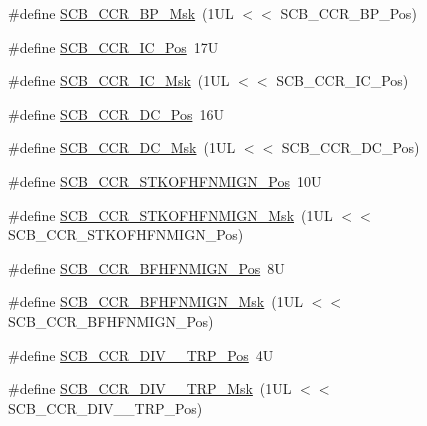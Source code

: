 \begin{DoxyCompactItemize}
\item 
\#define \mbox{\hyperlink{group___c_m_s_i_s___s_c_b_ga7fac248cabee94546aa9530d27217772}{S\+C\+B\+\_\+\+C\+C\+R\+\_\+\+B\+P\+\_\+\+Msk}}~(1\+U\+L $<$$<$ S\+C\+B\+\_\+\+C\+C\+R\+\_\+\+B\+P\+\_\+\+Pos)
\item 
\#define \mbox{\hyperlink{group___c_m_s_i_s___s_c_b_ga33f0f2a0818b2570f3e00b7e79501448}{S\+C\+B\+\_\+\+C\+C\+R\+\_\+\+I\+C\+\_\+\+Pos}}~17U
\item 
\#define \mbox{\hyperlink{group___c_m_s_i_s___s_c_b_gaf2ff8f5957edac919e28b536aa6c0a59}{S\+C\+B\+\_\+\+C\+C\+R\+\_\+\+I\+C\+\_\+\+Msk}}~(1\+U\+L $<$$<$ S\+C\+B\+\_\+\+C\+C\+R\+\_\+\+I\+C\+\_\+\+Pos)
\item 
\#define \mbox{\hyperlink{group___c_m_s_i_s___s_c_b_gaa1896a99252649cfb96139b56ba87d9b}{S\+C\+B\+\_\+\+C\+C\+R\+\_\+\+D\+C\+\_\+\+Pos}}~16U
\item 
\#define \mbox{\hyperlink{group___c_m_s_i_s___s_c_b_ga57b3909dff40a9c28ec50991e4202678}{S\+C\+B\+\_\+\+C\+C\+R\+\_\+\+D\+C\+\_\+\+Msk}}~(1\+U\+L $<$$<$ S\+C\+B\+\_\+\+C\+C\+R\+\_\+\+D\+C\+\_\+\+Pos)
\item 
\#define \mbox{\hyperlink{group___c_m_s_i_s___s_c_b_ga98372e0d55ce8573350ce36c500e0555}{S\+C\+B\+\_\+\+C\+C\+R\+\_\+\+S\+T\+K\+O\+F\+H\+F\+N\+M\+I\+G\+N\+\_\+\+Pos}}~10U
\item 
\#define \mbox{\hyperlink{group___c_m_s_i_s___s_c_b_gaf7004d71376738038e912def01c31fe8}{S\+C\+B\+\_\+\+C\+C\+R\+\_\+\+S\+T\+K\+O\+F\+H\+F\+N\+M\+I\+G\+N\+\_\+\+Msk}}~(1\+U\+L $<$$<$ S\+C\+B\+\_\+\+C\+C\+R\+\_\+\+S\+T\+K\+O\+F\+H\+F\+N\+M\+I\+G\+N\+\_\+\+Pos)
\item 
\#define \mbox{\hyperlink{group___c_m_s_i_s___s_c_b_ga4010a4f9e2a745af1b58abe1f791ebbf}{S\+C\+B\+\_\+\+C\+C\+R\+\_\+\+B\+F\+H\+F\+N\+M\+I\+G\+N\+\_\+\+Pos}}~8U
\item 
\#define \mbox{\hyperlink{group___c_m_s_i_s___s_c_b_ga89a28cc31cfc7d52d9d7a8fcc69c7eac}{S\+C\+B\+\_\+\+C\+C\+R\+\_\+\+B\+F\+H\+F\+N\+M\+I\+G\+N\+\_\+\+Msk}}~(1\+U\+L $<$$<$ S\+C\+B\+\_\+\+C\+C\+R\+\_\+\+B\+F\+H\+F\+N\+M\+I\+G\+N\+\_\+\+Pos)
\item 
\#define \mbox{\hyperlink{group___c_m_s_i_s___s_c_b_gac8d512998bb8cd9333fb7627ddf59bba}{S\+C\+B\+\_\+\+C\+C\+R\+\_\+\+D\+I\+V\+\_\+\_\+\+T\+R\+P\+\_\+\+Pos}}~4U
\item 
\#define \mbox{\hyperlink{group___c_m_s_i_s___s_c_b_gabb9aeac71b3abd8586d0297070f61dcb}{S\+C\+B\+\_\+\+C\+C\+R\+\_\+\+D\+I\+V\+\_\+\_\+\+T\+R\+P\+\_\+\+Msk}}~(1\+U\+L $<$$<$ S\+C\+B\+\_\+\+C\+C\+R\+\_\+\+D\+I\+V\+\_\+\_\+\+T\+R\+P\+\_\+\+Pos)

\end{DoxyCompactItemize}
